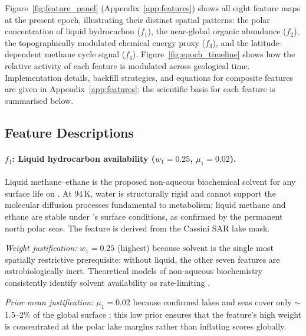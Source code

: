 Figure~\ref{fig:feature_panel} (Appendix~\ref{app:features}) shows all eight feature maps at the present epoch, illustrating their distinct spatial patterns: the polar concentration of liquid hydrocarbon ($f_1$), the near-global organic abundance ($f_2$), the topographically modulated chemical energy proxy ($f_3$), and the latitude-dependent methane cycle signal ($f_4$).  Figure~\ref{fig:epoch_timeline} shows how the relative activity of each feature is modulated across geological time.  Implementation details, backfill strategies, and equations for composite features are given in Appendix~\ref{app:features}; the scientific basis for each feature is summarised below.

\subsection{Feature Descriptions}
\label{sec:feature_descriptions}

\paragraph{$f_1$: Liquid hydrocarbon availability ($w_1 = 0.25$, $\mu_1 = 0.02$).}
Liquid methane--ethane is the proposed non-aqueous biochemical solvent for any surface life on \titan{} \citep{McKaySmith2005,McKay2016}.  At 94\,K, water is structurally rigid and cannot support the molecular diffusion processes fundamental to metabolism; liquid methane and ethane are stable under \titan{}'s surface conditions, as confirmed by the permanent north polar seas.  The feature is derived from the Cassini SAR lake mask.

\textit{Weight justification:} $w_1 = 0.25$ (highest) because solvent is the single most spatially restrictive prerequisite: without liquid, the other seven features are astrobiologically inert.  Theoretical models of non-aqueous biochemistry consistently identify solvent availability as rate-limiting \citep{Stevenson2015,Benner2004}.

\textit{Prior mean justification:} $\mu_1 = 0.02$ because confirmed lakes and seas cover only $\sim$1.5--2\% of the global surface \citep{Hayes2008}; this low prior ensures that the feature's high weight is concentrated at the polar lake margins rather than inflating scores globally.

